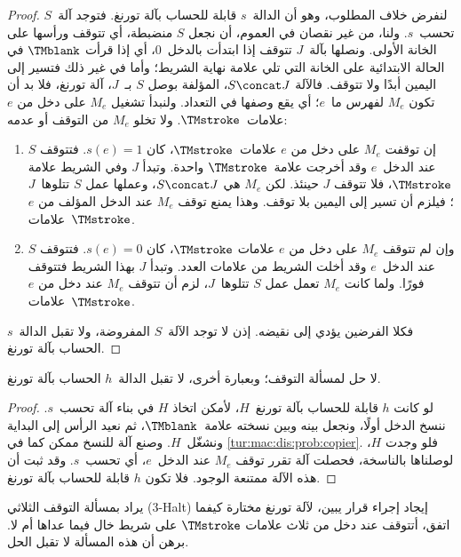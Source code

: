 \documentclass[../../../include/open-logic-section]{subfiles}
\begin{document}
\begin{proof}
لنفرض خلاف المطلوب، وهو أن الدالة~$s$ قابلة للحساب بآلة تورنغ.
فتوجد آلة~$S$ تحسب~$s$. ولنا، من غير نقصان في العموم، أن نجعل
$S$ منضبطة، أي تتوقف ورأسها على الخانة الأولى. ونصلها بآلة~$J$
تتوقف إذا ابتدأت بالدخل~$0$، أي إذا قرأت $\TMblank$ في الحالة
الابتدائية على الخانة التي تلي علامة نهاية الشريط؛ وأما في غير
ذلك فتسير إلى اليمين أبدًا ولا تتوقف. فالآلة $S\concat J$،
المؤلفة بوصل $S$ بـ~$J$، آلة تورنغ، فلا بد أن تكون $M_e$
لفهرس ما~$e$؛ أي يقع وصفها في التعداد. ولنبدأ تشغيل $M_e$
على دخل من $e$ علامات~$\TMstroke$. ولا تخلو $M_e$ من التوقف
أو عدمه:
\begin{enumerate}
\item إن توقفت $M_e$ على دخل من $e$ علامات~$\TMstroke$،
  كان $s(e)=1$. فتتوقف $S$ عند الدخل~$e$ وقد أخرجت
  علامة~$\TMstroke$ واحدة. وتبدأ $J$ وفي الشريط علامة
  $\TMstroke$، فلا تتوقف $J$ حينئذ. لكن $M_e$ هي
  $S\concat J$، وعملها عمل $S$ تتلوها~$J$؛ فيلزم أن تسير
  إلى اليمين بلا توقف. وهذا يمنع توقف $M_e$ عند الدخل المؤلف
  من $e$ علامات~$\TMstroke$.

\item وإن لم تتوقف $M_e$ على دخل من $e$ علامات
  $\TMstroke$، كان $s(e)=0$. فتتوقف $S$ عند الدخل~$e$
  وقد أخلت الشريط من علامات العدد. وتبدأ $J$ بهذا الشريط فتتوقف
  فورًا. ولما كانت $M_e$ تعمل عمل $S$ تتلوها~$J$، لزم أن
  تتوقف $M_e$ عند دخل من $e$ علامات~$\TMstroke$.
\end{enumerate}
فكلا الفرضين يؤدي إلى نقيضه. إذن لا توجد الآلة~$S$ المفروضة،
ولا تقبل الدالة~$s$ الحساب بآلة تورنغ.
\end{proof}

\begin{thm}
لا حل لمسألة التوقف؛ وبعبارة أخرى، لا تقبل الدالة~$h$ الحساب
بآلة تورنغ.
\end{thm}

\begin{proof}
لو كانت $h$ قابلة للحساب بآلة تورنغ~$H$، لأمكن اتخاذ $H$
في بناء آلة تحسب~$s$. ننسخ الدخل أولًا، ونجعل بينه وبين نسخته
علامة~$\TMblank$، ثم نعيد الرأس إلى البداية ونشغّل~$H$.
وصنع آلة للنسخ ممكن كما في \cref{tur:mac:dis:prob:copier}.
فلو وجدت $H$، لوصلناها بالناسخة، فحصلت آلة تقرر توقف $M_e$
عند الدخل~$e$، أي تحسب~$s$. وقد ثبت أن هذه الآلة ممتنعة
الوجود. فلا تكون $h$ قابلة للحساب بآلة تورنغ.
\end{proof}

\begin{prob}
يراد بمسألة التوقف الثلاثي (3-Halt) إيجاد إجراء قرار يبين، لآلة
تورنغ مختارة كيفما اتفق، أتتوقف عند دخل من ثلاث علامات
$\TMstroke$ على شريط خال فيما عداها أم لا. برهن أن هذه المسألة
لا تقبل الحل.
\end{prob}
\end{document}
